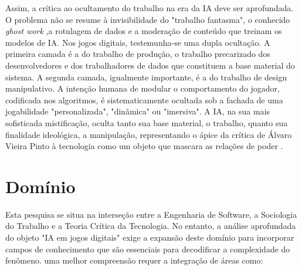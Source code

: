 Assim, a crítica ao ocultamento do trabalho na era da IA deve ser aprofundada. O problema não se resume à invisibilidade do 
"trabalho fantasma", o conhecido \textit{ghost work} \cite{GraySuri2019},a rotulagem de dados e a moderação de conteúdo que treinam os modelos de IA. 
Nos jogos digitais, testemunha-se uma dupla ocultação. A primeira camada é a do trabalho de produção, o trabalho precarizado dos 
desenvolvedores e dos trabalhadores de dados que constituem a base material do sistema. A segunda camada, igualmente importante, é a 
do trabalho de design manipulativo. A intenção humana de modular o comportamento do jogador, codificada nos algoritmos, é 
sistematicamente ocultada sob a  fachada de uma jogabilidade "personalizada", "dinâmica" ou "imersiva". A IA, na sua mais sofisticada 
mistificação, oculta tanto sua base material, o trabalho, quanto sua finalidade ideológica, a manipulação, representando o ápice da crítica 
de Álvaro Vieira Pinto à tecnologia como um objeto que mascara as relações de poder \cite{VieiraPinto2005}.

\section{Domínio}\label{sec:dominio}

Esta pesquisa se situa na interseção entre a Engenharia de Software, a Sociologia do Trabalho e a Teoria Crítica da Tecnologia. No 
entanto, a análise aprofundada do objeto "IA em jogos digitais" exige a expansão deste domínio para incorporar campos de conhecimento 
que são essenciais para decodificar a complexidade do fenômeno. uma melhor compreensão requer a integração de áreas como:

